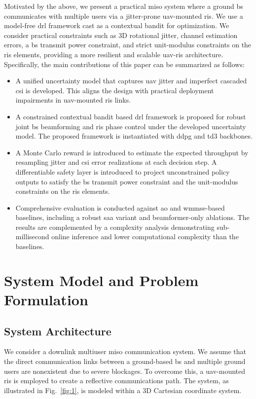 Motivated by the above, we present a practical \gls{miso} system where a ground \gls{bs} communicates with multiple users via a jitter-prone \gls{uav}-mounted \gls{ris}. We use a model-free \gls{drl} framework cast as a contextual bandit for optimization. We consider practical constraints such as 3D rotational jitter, channel estimation errors, a \gls{bs} transmit power constraint, and strict unit-modulus constraints on the \gls{ris} elements, providing a more resilient and scalable \gls{uav}-\gls{ris} architecture.
Specifically, the main contributions of this paper can be summarized as follows:
\begin{itemize}
\item A unified uncertainty model that captures \gls{uav} jitter and imperfect cascaded \gls{csi} is developed. This aligns the design with practical deployment impairments in \gls{uav}-mounted \gls{ris} links.
\item A constrained contextual bandit based \gls{drl} framework is proposed for robust joint \gls{bs} beamforming and \gls{ris} phase control under the developed uncertainty model. The proposed framework is instantiated with \gls{ddpg} and \gls{td3} backbones.
\item A Monte Carlo reward is introduced to estimate the expected throughput by resampling jitter and \gls{csi} error realizations at each decision step. A differentiable safety layer is introduced to project unconstrained policy outputs to satisfy the \gls{bs} transmit power constraint and the unit-modulus constraints on the \gls{ris} elements.
\item Comprehensive evaluation is conducted against \gls{ao} and \gls{wmmse}-based baselines, including a robust \gls{saa} variant and beamformer-only ablations. The results are complemented by a complexity analysis demonstrating sub-millisecond online inference and lower computational complexity than the baselines.
\end{itemize}
\section{System Model and Problem Formulation}
\label{sec:system_model}
\subsection{System Architecture}
We consider a downlink multiuser \gls{miso} communication system. We assume that the direct communication links between a ground-based \gls{bs} and multiple ground users are nonexistent due to severe blockages. To overcome this, a \gls{uav}-mounted \gls{ris} is employed to create a reflective communications path. The system, as illustrated in Fig.~\ref{fig:1}, is modeled within a 3D Cartesian coordinate system.

